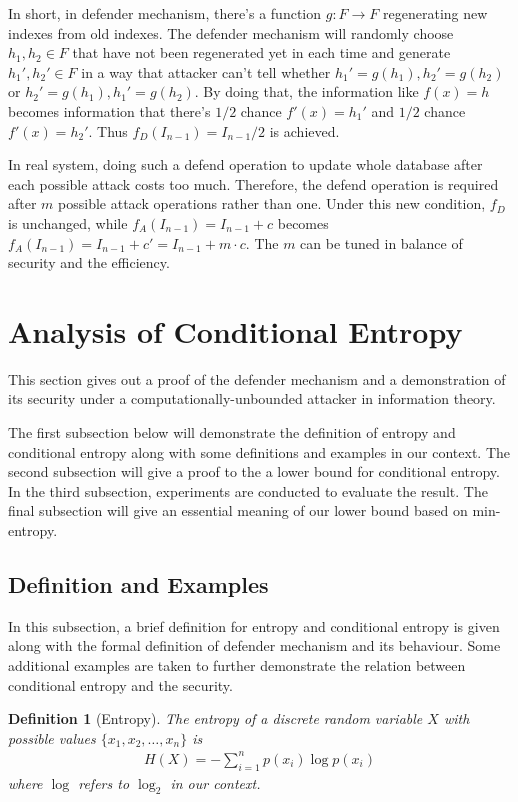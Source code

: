 \documentclass[10pt, conference, compsocconf]{IEEEtran}
\newtheorem{mydef}{Definition}
\begin{document}
		In short, in defender mechanism,
		there's a function $g: F \rightarrow F$ regenerating 
		new indexes from old indexes. The defender mechanism
		will randomly choose $h_1, h_2 \in F$ that have
		not been regenerated yet in each time and generate
		$h_1', h_2' \in F$ in a way that attacker can't tell whether
		$h_1' = g(h_1), h_2' = g(h_2)$ or $h_2' = g(h_1), h_1' = g(h_2)$.
		By doing that, the information like $f(x) = h$ becomes
		information that there's $1/2$ chance $f'(x) = h_1'$ and $1/2$ chance $f'(x) = h_2'$.
		Thus $f_D(I_{n-1}) = I_{n-1}/2$ is achieved.
		
		In real system, doing such a defend operation to update whole
		database after each possible attack costs too much.
		Therefore, the defend operation is required after $m$
		possible attack operations rather than one. Under this
		new condition, $f_D$ is unchanged, while $f_A(I_{n-1}) = I_{n-1}+c$
		becomes $f_A(I_{n-1}) = I_{n-1}+c' = I_{n-1}+m \cdot c$.
		The $m$ can be tuned in balance of security and the
		efficiency.
		
\section{Analysis of Conditional Entropy}\label{sec_proof}
	This section gives out a proof of the defender mechanism 
	and a demonstration
	of its security under a computationally-unbounded attacker
	in information theory.
	
	The first subsection below will demonstrate the definition
	of entropy and conditional entropy along with some
	definitions and examples in our context. The second subsection
	will give a proof to the a lower bound for conditional entropy. 
	In the third subsection, experiments
	are conducted to evaluate the result. The final subsection
	will give an essential meaning of our lower bound based on min-entropy.
	
	\subsection{Definition and Examples}
		In this subsection, a brief definition for entropy and conditional
		entropy is given along with the formal definition of defender mechanism
		and its behaviour.
		Some additional examples are taken to further
		demonstrate the relation between conditional entropy and
		the security.
		
		\begin{mydef}[Entropy]\label{def_entropy}
			The entropy of a discrete random variable $X$ with
			possible values $\{x_1, x_2, \ldots, x_n\}$ is
			\begin{align}
				H(X) = -\sum_{i=1}^n p(x_i)\log p(x_i)
			\end{align}
			where $\log$ refers to $\log_2$ in our context.
		\end{mydef}
		
\end{document}
